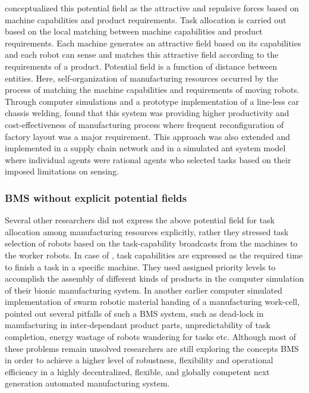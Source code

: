  conceptualized this potential field as the attractive and repulsive forces based on machine capabilities and product requirements. Task allocation is carried out based on the local matching between machine capabilities and product requirements. Each machine generates an attractive field based on its capabilities and each robot can sense and matches this attractive field according to the requirements of a product. Potential field is a function of distance between entities. Here, self-organization of manufacturing resources occurred by the process of matching the machine capabilities and requirements of moving robots. Through computer simulations and a prototype implementation of a line-less car chassis welding,  found that this system was providing higher productivity and cost-effectiveness of manufacturing process where frequent reconfiguration of factory layout was a major requirement. This approach was also extended and implemented in a supply chain network and in a simulated ant system model where individual agents were rational agents who selected tasks based on their imposed limitations on sensing.
\subsubsection*{BMS without explicit potential fields}
Several other researchers did not express the above potential field for task allocation among manufacturing resources explicitly, rather they stressed task selection of robots based on the task-capability broadcasts from the machines to the worker robots. In case of , task capabilities are expressed as the required time to finish a task in a specific machine. They used assigned priority levels to accomplish the assembly of different kinds of products in the computer simulation of their bionic manufacturing system. In another earlier computer simulated implementation of swarm robotic material handing of a manufacturing work-cell,  pointed out several pitfalls of such a BMS system, such as dead-lock in manufacturing in inter-dependant product parts, unpredictability of task completion, energy wastage of robots wandering for tasks etc. Although most of these problems remain unsolved researchers are still exploring the concepts BMS in order to achieve a higher level of robustness, flexibility and operational efficiency in a highly decentralized, flexible, and globally competent next generation automated manufacturing system.\\

